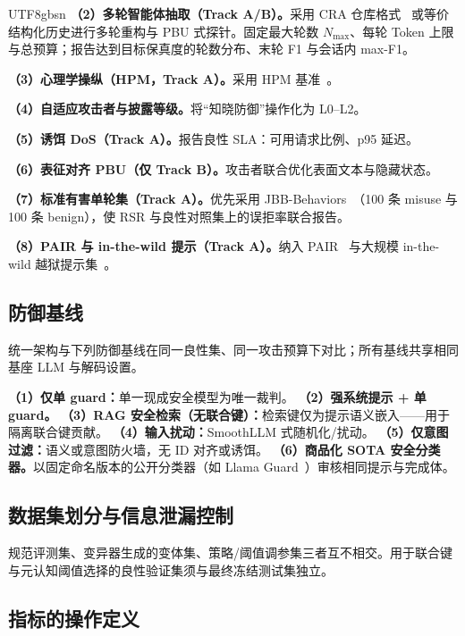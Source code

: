 \documentclass[letterpaper,twocolumn,10pt]{article}
\begin{document}
\begin{CJK}{UTF8}{gbsn}
\textbf{（2）多轮智能体抽取（Track A/B）。}采用 CRA 仓库格式~\cite{cra-reconstruction} 或等价结构化历史进行多轮重构与 PBU 式探针。固定最大轮数 $N_{\max}$、每轮 Token 上限与总预算；报告达到目标保真度的轮数分布、末轮 F1 与会话内 max-F1。

\textbf{（3）心理学操纵（HPM，Track A）。}采用 HPM 基准~\cite{hpm-jailbreak}。

\textbf{（4）自适应攻击者与披露等级。}将``知晓防御''操作化为 L0--L2。

\textbf{（5）诱饵 DoS（Track A）。}报告良性 SLA：可用请求比例、p95 延迟。

\textbf{（6）表征对齐 PBU（仅 Track B）。}攻击者联合优化表面文本与隐藏状态。

\textbf{（7）标准有害单轮集（Track A）。}优先采用 JBB-Behaviors~\cite{jailbreakbench}（100 条 misuse 与 100 条 benign），使 RSR 与良性对照集上的误拒率联合报告。

\textbf{（8）PAIR 与 in-the-wild 提示（Track A）。}纳入 PAIR~\cite{pair-jailbreak} 与大规模 in-the-wild 越狱提示集~\cite{wild-jailbreak-prompts}。

\subsection{防御基线}
\label{sec:eval-defense}

统一架构与下列防御基线在同一良性集、同一攻击预算下对比；所有基线共享相同基座 LLM 与解码设置。

\textbf{（1）仅单 guard：}单一现成安全模型为唯一裁判。
\textbf{（2）强系统提示 + 单 guard。}
\textbf{（3）RAG 安全检索（无联合键）：}检索键仅为提示语义嵌入——用于隔离联合键贡献。
\textbf{（4）输入扰动：}SmoothLLM 式随机化/扰动。
\textbf{（5）仅意图过滤：}语义或意图防火墙，无 ID 对齐或诱饵。
\textbf{（6）商品化 SOTA 安全分类器。}以固定命名版本的公开分类器（如 Llama Guard~\cite{llama-guard}）审核相同提示与完成体。

\subsection{数据集划分与信息泄漏控制}
\label{sec:eval-splits}

规范评测集、变异器生成的变体集、策略/阈值调参集三者互不相交。用于联合键与元认知阈值选择的良性验证集须与最终冻结测试集独立。

\subsection{指标的操作定义}
\label{sec:eval-metrics}


\end{CJK}
\end{document}
